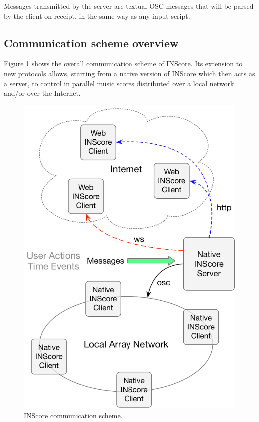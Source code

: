 \documentclass{article}
\begin{document}
Messages transmitted by the server are textual OSC messages that will be parsed by the client on receipt, in the same way as any input script.  

\subsection{Communication scheme overview}\label{sec:comm}

Figure \ref{fig:comm} shows the overall communication scheme of INScore. Its extension to new protocols allows, starting from a native version of INScore which then acts as a server, to control in parallel music scores distributed over a local network and/or over the Internet.

\begin{figure}[h]
\centering
\includegraphics[width=0.90\columnwidth]{rsrc/communication.pdf}
\caption{INScore communication scheme.}
\label{fig:comm}
\end{figure}
\end{document}
